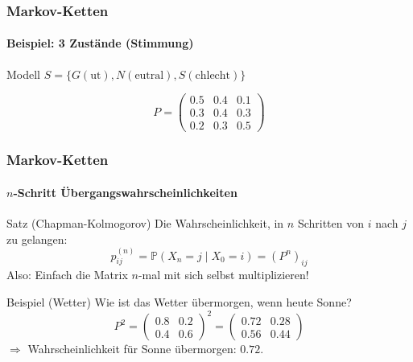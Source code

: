 \documentclass{beamer}
\newcommand{\PP}{\mathbb{P}}
\begin{document}
\begin{frame}
    \frametitle{Markov-Ketten}
\framesubtitle{Beispiel: 3 Zustände (Stimmung)}
    \begin{block}{Modell}
$S = \{G(\text{ut}), N(\text{eutral}), S(\text{chlecht})\}$
\end{block}

\begin{center}
\end{center}

\[
P = \begin{pmatrix} 0.5 & 0.4 & 0.1 \\ 0.3 & 0.4 & 0.3 \\ 0.2 & 0.3 & 0.5 \end{pmatrix}
\]
 \end{frame}



\begin{frame}
    \frametitle{Markov-Ketten}
\framesubtitle{$n$-Schritt Übergangswahrscheinlichkeiten}
    \begin{block}{Satz (Chapman-Kolmogorov)}
Die Wahrscheinlichkeit, in $n$ Schritten von $i$ nach $j$ zu gelangen:
\[
p_{ij}^{(n)} = \PP(X_n = j \mid X_0 = i) = (P^n)_{ij}
\]
Also: Einfach die Matrix $n$-mal mit sich selbst multiplizieren!
\end{block}
\begin{block}{Beispiel (Wetter)}
Wie ist das Wetter übermorgen, wenn heute Sonne?
\[
P^2 = \begin{pmatrix} 0.8 & 0.2 \\ 0.4 & 0.6 \end{pmatrix}^2 = \begin{pmatrix} 0.72 & 0.28 \\ 0.56 & 0.44 \end{pmatrix}
\]
$\Rightarrow$ Wahrscheinlichkeit für Sonne übermorgen: $0.72$.
\end{block}
 \end{frame}
\end{document}
